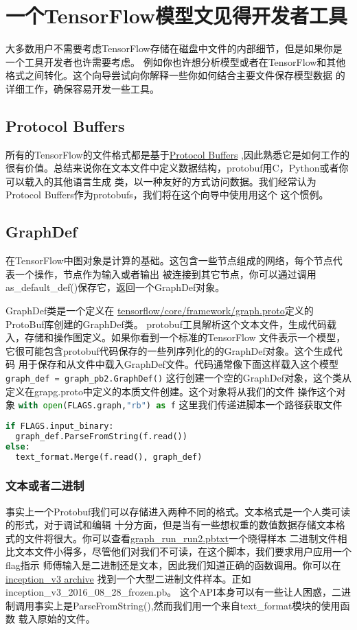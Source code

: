\section{一个TensorFlow模型文见得开发者工具}
大多数用户不需要考虑TensorFlow存储在磁盘中文件的内部细节，但是如果你是一个工具开发者也许需要考虑。
例如你也许想分析模型或者在TensorFlow和其他格式之间转化。这个向导尝试向你解释一些你如何结合主要文件保存模型数据
的详细工作，确保容易开发一些工具。
\subsection{Protocol Buffers}
所有的TensorFlow的文件格式都是基于\href{https://developers.google.com/protocol-buffers/?hl=en}{Protocol Buffers}
,因此熟悉它是如何工作的很有价值。总结来说你在文本文件中定义数据结构，protobuf用C，Python或者你可以载入的其他语言生成
类，以一种友好的方式访问数据。我们经常认为Protocol Buffers作为protobufs，我们将在这个向导中使用用这个
这个惯例。
\subsection{GraphDef}
在TensorFlow中图对象是计算的基础。这包含一些节点组成的网络，每个节点代表一个操作，节点作为输入或者输出
被连接到其它节点，你可以通过调用as\_default\_def()保存它，返回一个GraphDef对象。

GraphDef类是一个定义在
\href{https://github.com/tensorflow/tensorflow/blob/master/tensorflow/core/framework/graph.proto}{tensorflow/core/framework/graph.proto}定义的ProtoBuf库创建的GraphDef类。
protobuf工具解析这个文本文件，生成代码载入，存储和操作图定义。如果你看到一个标准的TensorFlow
文件表示一个模型，它很可能包含protobuf代码保存的一些列序列化的的GraphDef对象。这个生成代码
用于保存和从文件中载入GraphDef文件。代码通常像下面这样载入这个模型
\lstinline[language=Python]{graph_def = graph_pb2.GraphDef()}
这行创建一个空的GraphDef对象，这个类从定义在grapg.proto中定义的本质文件创建。这个对象将从我们的文件
操作这个对象
\lstinline[language=Python]{with open(FLAGS.graph,"rb") as f}
这里我们传递进脚本一个路径获取文件
\begin{lstlisting}[language=Python]
if FLAGS.input_binary:
  graph_def.ParseFromString(f.read())
else:
  text_format.Merge(f.read(), graph_def)
\end{lstlisting}
\subsubsection{文本或者二进制}
事实上一个Protobuf我们可以存储进入两种不同的格式。文本格式是一个人类可读的形式，对于调试和编辑
十分方面，但是当有一些想权重的数值数据存储文本格式的文件将很大。你可以查看\href{https://github.com/tensorflow/tensorboard/blob/master/tensorboard/demo/data/graph_run_run2.pbtxt}{graph\_run\_run2.pbtxt}一个晓得样本
二进制文件相比文本文件小得多，尽管他们对我们不可读，在这个脚本，我们要求用户应用一个flag指示
师傅输入是二进制还是文本，因此我们知道正确的函数调用。你可以在\href{https://storage.googleapis.com/download.tensorflow.org/models/inception_v3_2016_08_28_frozen.pb.tar.gz}{inception\_v3 archive}
找到一个大型二进制文件样本。正如inception\_v3\_2016\_08\_28\_frozen.pb。
这个API本身可以有一些让人困惑，二进制调用事实上是ParseFromString(),然而我们用一个来自text\_format模块的使用函数
载入原始的文件。

